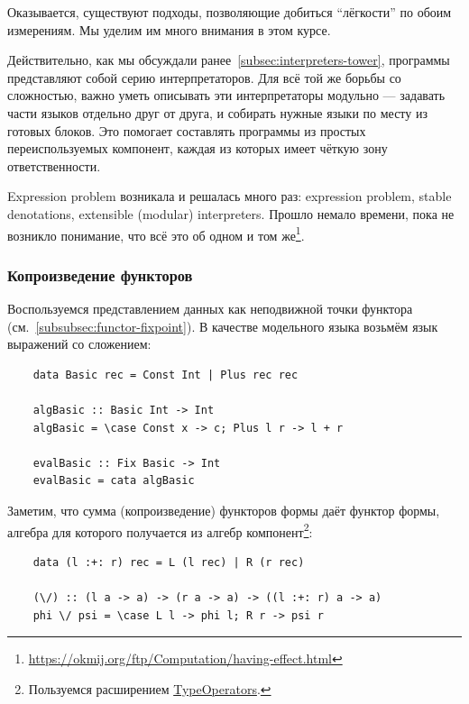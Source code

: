 Оказывается, существуют подходы, позволяющие добиться ``лёгкости'' по обоим измерениям.
Мы уделим им много внимания в этом курсе.

Действительно, как мы обсуждали ранее~\ref{subsec:interpreters-tower}, программы представляют собой серию интерпретаторов.
Для всё той же борьбы со сложностью, важно уметь описывать эти интерпретаторы модульно --- задавать части языков отдельно друг от друга, и собирать нужные языки по месту из готовых блоков.
Это помогает составлять программы из простых переиспользуемых компонент, каждая из которых имеет чёткую зону ответственности.

Expression problem возникала и решалась много раз: expression problem, stable denotations, extensible (modular) interpreters.
Прошло немало времени, пока не возникло понимание, что всё это об одном и том же\footnote{\url{https://okmij.org/ftp/Computation/having-effect.html}}.


\subsubsection{Копроизведение функторов} \label{subsubsec:functor-coprod}

Воспользуемся представлением данных как неподвижной точки функтора (см.~\ref{subsubsec:functor-fixpoint}).
В качестве модельного языка возьмём язык выражений со сложением:
\begin{verbatim}
    data Basic rec = Const Int | Plus rec rec

    algBasic :: Basic Int -> Int
    algBasic = \case Const x -> c; Plus l r -> l + r

    evalBasic :: Fix Basic -> Int
    evalBasic = cata algBasic
\end{verbatim}

Заметим, что сумма (копроизведение) функторов формы даёт функтор формы, алгебра для которого получается из алгебр компонент\footnote{Пользуемся расширением \href{https://ghc.gitlab.haskell.org/ghc/doc/users_guide/exts/type_operators.html}{TypeOperators}.}:
\begin{verbatim}
    data (l :+: r) rec = L (l rec) | R (r rec)

    (\/) :: (l a -> a) -> (r a -> a) -> ((l :+: r) a -> a)
    phi \/ psi = \case L l -> phi l; R r -> psi r
\end{verbatim}

